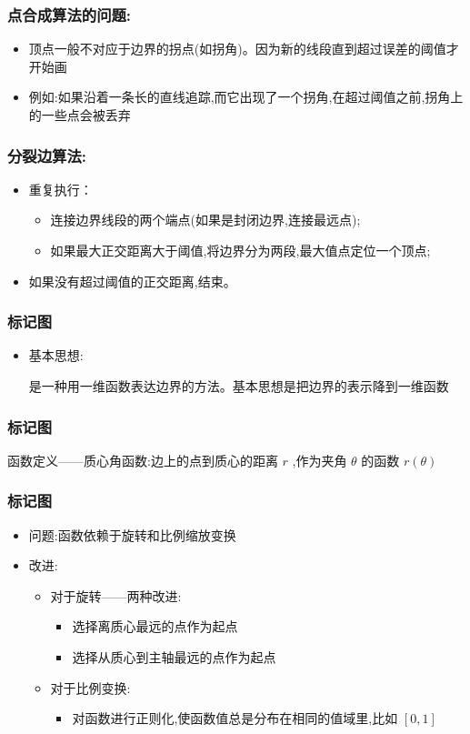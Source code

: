 \documentclass{beamer}
\begin{document}
\begin{frame}
\frametitle{点合成算法的问题:}
\label{sec-2-8}

\begin{itemize}
\item 顶点一般不对应于边界的拐点(如拐角)。因为新的线段直到超过误差的阈值才开始画
\item 例如:如果沿着一条长的直线追踪,而它出现了一个拐角,在超过阈值之前,拐角上的一些点会被丢弃
\end{itemize}
\end{frame}
\begin{frame}
\frametitle{分裂边算法:}
\label{sec-2-9}

\begin{itemize}
\item 重复执行：
\begin{itemize}
\item 连接边界线段的两个端点(如果是封闭边界,连接最远点);
\item 如果最大正交距离大于阈值,将边界分为两段,最大值点定位一个顶点;
\end{itemize}
\item 如果没有超过阈值的正交距离,结束。
\end{itemize}
\end{frame}
\begin{frame}
\frametitle{标记图}
\label{sec-2-10}

\begin{itemize}
\item 基本思想:

     是一种用一维函数表达边界的方法。基本思想是把边界的表示降到一维函数
\end{itemize}
\end{frame}
\begin{frame}
\frametitle{标记图}
\label{sec-2-11}

   函数定义——质心角函数:边上的点到质心的距离 $r$ ,作为夹角 $\theta$ 的函数 $r(\theta)$
\end{frame}
\begin{frame}
\frametitle{标记图}
\label{sec-2-12}

\begin{itemize}
\item 问题:函数依赖于旋转和比例缩放变换
\item 改进:
\begin{itemize}
\item 对于旋转——两种改进:
\begin{itemize}
\item 选择离质心最远的点作为起点
\item 选择从质心到主轴最远的点作为起点
\end{itemize}
\item 对于比例变换:
\begin{itemize}
\item 对函数进行正则化,使函数值总是分布在相同的值域里,比如 $[0,1]$
\end{itemize}
\end{itemize}
\end{itemize}
\end{frame}
\end{document}
